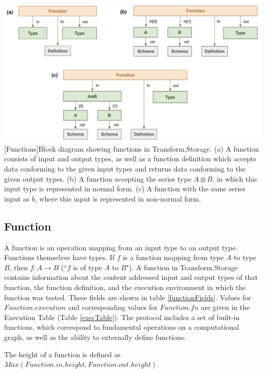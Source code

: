 \documentclass[9pt, oneside]{article}   	%
\begin{document}
\begin{center}
\includegraphics[width=1\columnwidth]{fig_functions}
[Functions]{Block diagram showing functions in Transform.Storage. (a) A function consists of input and output types, as well as a function definition which accepts data conforming to the given input types and returns data conforming to the given output types. (b) A function accepting the series type $A \otimes B$, in which this input type is represented in normal form. (c) A function with the same series input as $b$, where this input is represented in non-normal form.}
\label{functions_fig}
\end{center}
\setlength{\parindent}{.5 cm}

\subsection{Function}\label{function}
A function is an operation mapping from an input type to an output type. Functions themselves have types. If $f$ is a function mapping from type $A$ to type $B$, then $f : A \rightarrow B$ (``$f$ is of type $A$ to $B$"). A function in Transform.Storage contains information about the content addressed input and output types of that function, the function definition, and the execution environment in which the function was tested. These fields are shown in table \ref{functionFields}.
Values for $Function.execution$ and corresponding values for $Function.fn$ are given in the Execution Table (Table \ref{execTable}). The protocol includes a set of built-in functions, which correspond to fundamental operations on a computational graph, as well as the ability to externally define functions.

The height of a function is defined as $Max( Function.in.height, Function.out.height )$.
\end{document}
